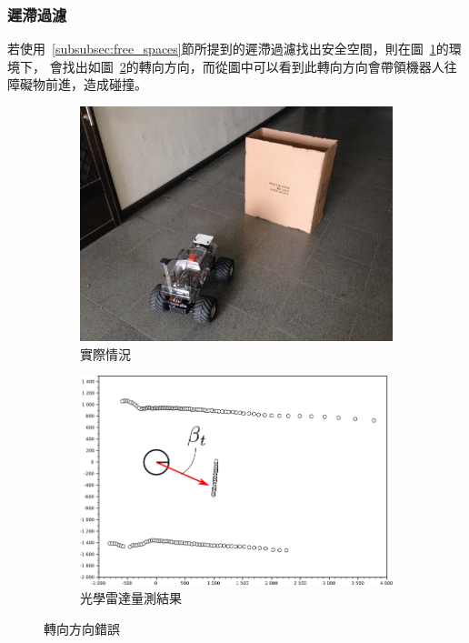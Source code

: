 \subsubsection{遲滯過濾}
若使用~\ref{subsubsec:free_spaces}節所提到的遲滯過濾找出安全空間，則在圖~\ref{f:hysteresis_error_env_real}的環境下，
會找出如圖~\ref{f:hysteresis_error_env}的轉向方向，而從圖中可以看到此轉向方向會帶領機器人往障礙物前進，造成碰撞。
\begin{figure}[h!]
	\centering
	\begin{subfigure}[t]{0.46\textwidth}
		\includegraphics[width=\textwidth]{figures/algorithm/hysteresis_error_env_real}
		\caption{實際情況}
		\label{f:hysteresis_error_env_real}
	\end{subfigure}
	\begin{subfigure}[t]{0.51\textwidth}
		\includegraphics[width=\textwidth]{figures/algorithm/hysteresis_error_env}
		\caption{光學雷達量測結果}
		\label{f:hysteresis_error_env}
	\end{subfigure}
	\caption{轉向方向錯誤}
	\label{f:hysteresis_error}
\end{figure}

